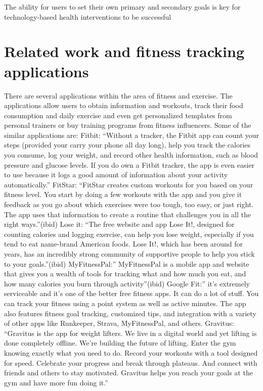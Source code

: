 The ability for users to set their own primary and secondary goals is key for technology-based health interventions to be successful\cite{inproceedings}

\section{Related work and fitness tracking applications}
There are several applications within the area of fitness and exercise. The applications allow users to obtain information and workouts, track their food consumption and daily exercise and even get personalized templates from personal trainers or buy training programs from fitness influencers. Some of the similar applications are:
Fitbit: “Without a tracker, the Fitbit app can count your steps (provided your carry your phone all day long), help you track the calories you consume, log your weight, and record other health information, such as blood pressure and glucose levels. If you do own a Fitbit tracker, the app is even easier to use because it logs a good amount of information about your activity automatically.”\cite{Duffy}
FitStar: “FitStar creates custom workouts for you based on your fitness level. You start by doing a few workouts with the app and you give it feedback as you go about which exercises were too tough, too easy, or just right. The app uses that information to create a routine that challenges you in all the right ways.”(ibid)
Lose it: “The free website and app Lose It!, designed for counting calories and logging exercise, can help you lose weight, especially if you tend to eat name-brand American foods. Lose It!, which has been around for years, has an incredibly strong community of supportive people to help you stick to your goals.”(ibid)
MyFitnessPal:” MyFitnessPal is a mobile app and website that gives you a wealth of tools for tracking what and how much you eat, and how many calories you burn through activity”(ibid)
Google Fit:” it's extremely serviceable and it's one of the better free fitness apps. It can do a lot of stuff. You can track your fitness using a point system as well as active minutes. The app also features fitness goal tracking, customized tips, and integration with a variety of other apps like Runkeeper, Strava, MyFitnessPal, and others. \cite{Hindy}
Gravitus: “Gravitus is the app for weight lifters. We live in a digital world and yet lifting is done completely offline. We're building the future of lifting. Enter the gym knowing exactly what you need to do. Record your workouts with a tool designed for speed. Celebrate your progress and break through plateaus. And connect with friends and others to stay motivated. Gravitus helps you reach your goals at the gym and have more fun doing it.”\cite{Gravitus}

